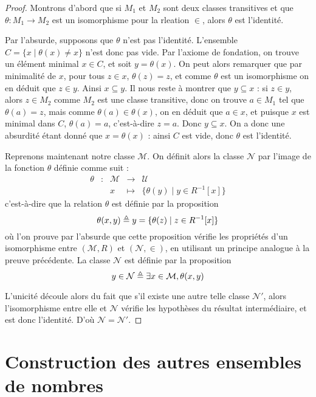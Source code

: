 \begin{proof}
  Montrons d'abord que si $M_1$ et $M_2$ sont deux classes transitives et que
  $\theta : M_1\to M_2$ est un isomorphisme pour la rleation $\in$, alors
  $\theta$ est l'identité.

  Par l'absurde, supposons que $\theta$ n'est pas l'identité. L'ensemble
  $C = \{x\mid \theta(x)\neq x\}$ n'est donc pas vide. Par l'axiome de fondation,
  on trouve un élément minimal $x\in C$, et soit $y = \theta(x)$. On peut alors
  remarquer que par minimalité de $x$, pour tous $z\in x$, $\theta(z)=z$, et
  comme $\theta$ est un isomorphisme on en déduit que $z\in y$. Ainsi
  $x\subseteq y$. Il nous reste à montrer que $y\subseteq x$ : si $z\in y$, alors
  $z\in M_2$ comme $M_2$ est une classe transitive, donc on trouve $a\in M_1$ tel
  que $\theta(a)=z$, mais comme $\theta(a)\in \theta(x)$, on en déduit que
  $a\in x$, et puisque $x$ est minimal dans $C$, $\theta(a)=a$, c'est-à-dire
  $z = a$. Donc $y\subseteq x$. On a donc une absurdité étant donné que
  $x = \theta(x)$ : ainsi $C$ est vide, donc $\theta$ est l'identité.

  Reprenons maintenant notre classe $\mathcal M$. On définit alors la classe
  $\mathcal N$ par l'image de la fonction $\theta$ définie comme suit :
  \[\begin{array}{rcccl}
  \theta & : & \mathcal M & \longrightarrow & \mathcal U\\
  & & x & \longmapsto & \{\theta(y)\mid y \in R^{-1}[x]\}
  \end{array}\]
  c'est-à-dire que la relation $\theta$ est définie par la proposition
  \[\theta(x,y) \triangleq y = \{\theta(z)\mid z \in R^{-1}[x]\}\]
  où l'on prouve par l'absurde que cette proposition vérifie les propriétés d'un
  isomorphisme entre $(\mathcal M,R)$ et $(\mathcal N,\in)$, en utilisant un
  principe analogue à la preuve précédente. La classe $\mathcal N$ est définie
  par la proposition
  \[y \in \mathcal N \triangleq \exists x\in\mathcal M, \theta(x,y)\]

  L'unicité découle alors du fait que s'il existe une autre telle classe
  $\mathcal N'$, alors l'isomorphisme entre elle et $\mathcal N$ vérifie les
  hypothèses du résultat intermédiaire, et est donc l'identité. D'où
  $\mathcal N = \mathcal N'$.
\end{proof}

\section{Construction des autres ensembles de nombres}

